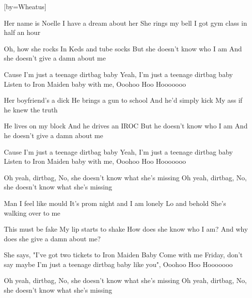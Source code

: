  

[by=Wheatus]




\beginverse
Her name is Noelle  \brk  I have a dream about her
She rings my bell  \brk  I got gym class in half an hour

Oh, how she rocks  \brk  In Keds and tube socks
But she doesn't know who I am  \brk  And she doesn't give a damn about me
\endverse

\beginchorus
Cause I'm just a teenage dirtbag baby
Yeah, I'm just a teenage dirtbag baby
Listen to Iron Maiden baby with me, \brk  Ooohoo Hoo Hooooooo
\endchorus

\beginverse
Her boyfriend's a dick  \brk  He brings a gun to school
And he'd simply kick  \brk  My ass if he knew the truth

He lives on my block  \brk  And he drives an IROC
But he doesn't know who I am  \brk  And he doesn't give a damn about me
\endverse

\beginchorus
Cause I'm just a teenage dirtbag baby
Yeah, I'm just a teenage dirtbag baby
Listen to Iron Maiden baby with me, \brk  Ooohoo Hoo Hooooooo

Oh yeah, dirtbag, \brk  No, she doesn't know what she's missing
Oh yeah, dirtbag, \brk  No, she doesn't know what she's missing
\endchorus

\beginverse
Man I feel like mould  \brk  It's prom night and I am lonely
Lo and behold  \brk  She's walking over to me

This must be fake  \brk  My lip starts to shake
How does she know who I am?  \brk  And why does she give a damn about me?

She says, "I've got two tickets to Iron Maiden Baby
Come with me Friday, don't say maybe
I'm just a teenage dirtbag baby like you", \brk  Ooohoo Hoo Hooooooo
\endverse

\beginchorus
Oh yeah, dirtbag, \brk  No, she doesn't know what she's missing
Oh yeah, dirtbag, \brk  No, she doesn't know what she's missing
\endchorus


\endsong
